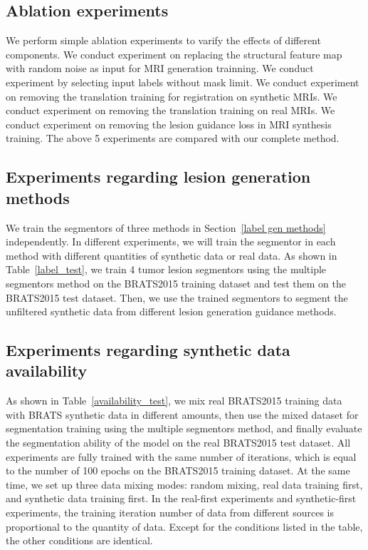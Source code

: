\documentclass[runningheads]{llncs}
\begin{document}
\subsection{Ablation experiments}
We perform simple ablation experiments to varify the effects of different components. We conduct experiment on replacing the structural feature map with random noise as input for MRI generation trainning. We conduct experiment by selecting input labels without mask limit. We conduct experiment on removing the translation training for registration on synthetic MRIs. We conduct experiment on removing the translation training on real MRIs. We conduct experiment on removing the lesion guidance loss in MRI synthesis training. The above 5 experiments are compared with our complete method.

\subsection{Experiments regarding lesion generation methods}
\label{label gen methods tests}
We train the segmentors of three methods in Section~\ref{label gen methods} independently. In different experiments, we will train the segmentor in each method with different quantities of synthetic data or real data. As shown in Table~\ref{label_test}, we train 4 tumor lesion segmentors using the multiple segmentors method on the BRATS2015 training dataset and test them on the BRATS2015 test dataset. Then, we use the trained segmentors to segment the unfiltered synthetic data from different lesion generation guidance methods.

\subsection{Experiments regarding synthetic data availability}
As shown in Table~\ref{availability_test}, we mix real BRATS2015 training data with BRATS synthetic data in different amounts, then use the mixed dataset for segmentation training using the multiple segmentors method, and finally evaluate the segmentation ability of the model on the real BRATS2015 test dataset. All experiments are fully trained with the same number of iterations, which is equal to the number of 100 epochs on the BRATS2015 training dataset. At the same time, we set up three data mixing modes: random mixing, real data training first, and synthetic data training first. In the real-first experiments and synthetic-first experiments, the training iteration number of data from different sources is proportional to the quantity of data. Except for the conditions listed in the table, the other conditions are identical.
\end{document}
